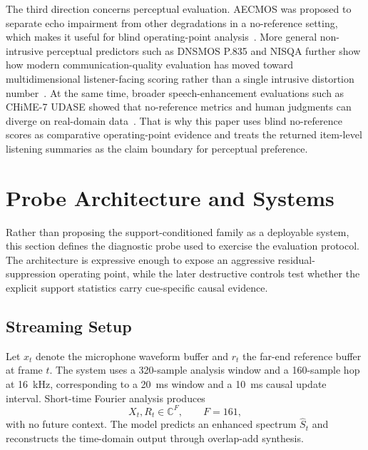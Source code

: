 \documentclass[journal]{IEEEtran}
\begin{document}
The third direction concerns perceptual evaluation. AECMOS was proposed to separate echo impairment from other degradations in a no-reference setting, which makes it useful for blind operating-point analysis~\cite{aecmos2021}. More general non-intrusive perceptual predictors such as DNSMOS P.835 and NISQA further show how modern communication-quality evaluation has moved toward multidimensional listener-facing scoring rather than a single intrusive distortion number~\cite{reddy2022dnsmosp835,mittag2021nisqa}. At the same time, broader speech-enhancement evaluations such as CHiME-7 UDASE showed that no-reference metrics and human judgments can diverge on real-domain data~\cite{udase2024eval}. That is why this paper uses blind no-reference scores as comparative operating-point evidence and treats the returned item-level listening summaries as the claim boundary for perceptual preference.

\section{Probe Architecture and Systems}
Rather than proposing the support-conditioned family as a deployable system, this section defines the diagnostic probe used to exercise the evaluation protocol. The architecture is expressive enough to expose an aggressive residual-suppression operating point, while the later destructive controls test whether the explicit support statistics carry cue-specific causal evidence.

\subsection{Streaming Setup}
Let $x_t$ denote the microphone waveform buffer and $r_t$ the far-end reference buffer at frame $t$. The system uses a 320-sample analysis window and a 160-sample hop at 16~kHz, corresponding to a 20~ms window and a 10~ms causal update interval. Short-time Fourier analysis produces
\begin{equation}
X_t, R_t \in \mathbb{C}^{F}, \qquad F = 161,
\end{equation}
with no future context. The model predicts an enhanced spectrum $\hat{S}_t$ and reconstructs the time-domain output through overlap-add synthesis.
\end{document}
